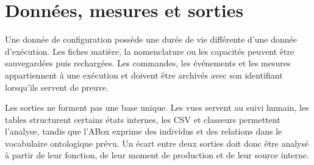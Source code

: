 \section{Données, mesures et sorties}

Une donnée de configuration possède une durée de vie différente d'une donnée d'exécution. Les fiches matière, la nomenclature ou les capacités peuvent être sauvegardées puis rechargées. Les commandes, les événements et les mesures appartiennent à une exécution et doivent être archivés avec son identifiant lorsqu'ils servent de preuve.

Les sorties ne forment pas une base unique. Les vues servent au suivi humain, les tables structurent certains états internes, les CSV et classeurs permettent l'analyse, tandis que l'ABox exprime des individus et des relations dans le vocabulaire ontologique prévu. Un écart entre deux sorties doit donc être analysé à partir de leur fonction, de leur moment de production et de leur source interne.
